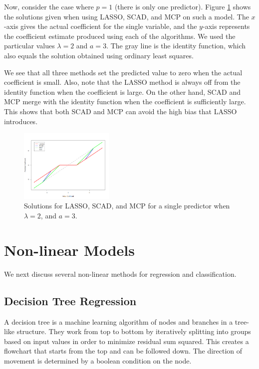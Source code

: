 \documentclass{article}
\begin{document}
Now, consider the case where $p=1$ (there is only one predictor). Figure \ref{fig:prediction} shows the solutions given when using LASSO, SCAD, and MCP on such a model. The $x$-axis gives the actual coefficient for the single variable, and the $y$-axis represents the coefficient estimate produced using each of the algorithms. We used the particular values $\lambda = 2$ and $a = 3$. The gray line is the identity function, which also equals the solution obtained using ordinary least squares.

We see that all three methods set the predicted value to zero when the actual coefficient is small. Also, note that the LASSO method is always off from the identity function when the coefficient is large. On the other hand, SCAD and MCP merge with the identity function when the coefficient is sufficiently large. This shows that both SCAD and MCP can avoid the high bias that LASSO introduces.

\begin{figure}[!h]
	\centering
	\caption{Solutions for LASSO, SCAD, and MCP for a single predictor when $\lambda=2$, and $a = 3$.}
	\label{fig:prediction}
	\includegraphics[width = 0.4\textwidth]{images/prediction.png}
\end{figure}

\section{Non-linear Models}
We next discuss several non-linear methods for regression and classification.
\subsection{Decision Tree Regression}
A decision tree is a machine learning algorithm of nodes and branches in a tree-like structure. They work from top to bottom by iteratively splitting into groups based on input values in order to minimize residual sum squared. This creates a flowchart that starts from the top and can be followed down. The direction of movement is determined by a boolean condition on the node.
\end{document}
